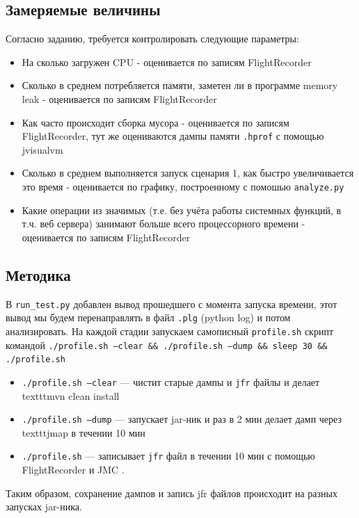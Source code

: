 \documentclass{article}
\begin{document}
	\subsection*{Замеряемые величины}
	Согласно заданию, требуется контролировать следующие параметры:
		\begin{itemize}
			\item На сколько загружен CPU - оценивается по записям FlightRecorder
			\item Сколько в среднем потребляется памяти, заметен ли в программе memory leak - оценивается по записям FlightRecorder
			\item Как часто происходит сборка мусора - оценивается по записям FlightRecorder, тут же оцениваются дампы памяти \texttt{.hprof} с помощью jvisualvm
			\item Сколько в среднем выполняется запуск сценария 1, как быстро увеличивается это время - оценивается по графику, построенному с помошью \texttt{analyze.py} 
			\item Какие операции из значимых (т.е. без учёта работы системных функций, в т.ч. веб сервера) занимают больше всего процессорного времени - оценивается по записям FlightRecorder
		\end{itemize}
	
	\subsection*{Методика}
	В \texttt{run\_test.py} добавлен вывод прошедшего с момента запуска времени, этот вывод мы будем перенаправлять в файл \texttt{.plg} (python log) и потом анализировать.
	На каждой стадии запускаем самописный \texttt{profile.sh} скрипт командой
	\texttt{./profile.sh --clear \&\& ./profile.sh --dump \&\& sleep 30 \&\& ./profile.sh}

		\begin{itemize}
			\item \texttt{./profile.sh --clear} --- чистит старые дампы и \texttt{jfr} файлы и делает texttt{mvn clean install}
			\item \texttt{./profile.sh --dump} --- запускает jar-ник и раз в 2 мин делает дамп через texttt{jmap} в течении 10 мин
			\item \texttt{./profile.sh} --- записывает \texttt{jfr} файл в течении 10 мин с помощью FlightRecorder и JMC .
		\end{itemize}

	Таким образом, сохранение дампов и запись jfr файлов происходит на разных запусках jar-ника.
\end{document}
